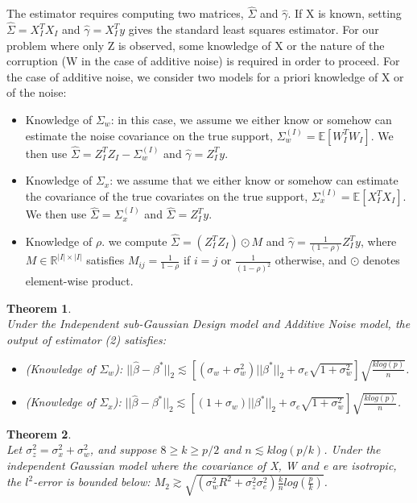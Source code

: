 \documentclass[a4paper,10pt]{article}
\newtheorem{theorem}{Theorem}
\theoremstyle{definition}
\begin{document}
The estimator requires computing two matrices, $\hat{\Sigma}$ and $\hat{\gamma}$. If X is known, setting $\hat{\Sigma} = X^T_I X_I$ and $\hat{\gamma} = X^T_Iy$ gives the standard least squares estimator. For our problem where only Z is observed, some knowledge of X or the nature of the corruption (W in the case of additive noise) is required in order to proceed. For the case of additive noise, we consider two models for a priori knowledge of X or of the noise:
\begin{itemize}
	\item Knowledge of $\Sigma_w$: in this case, we assume we either know or somehow can estimate the noise covariance on the true support, $\Sigma^{(I)}_w = \mathbb{E}[W^T_IW_I]$. We then use $\hat{\Sigma} = Z^T_I Z_I - \Sigma^{(I)}_w$ and $\hat{\gamma} = Z^T_Iy$.
	\item Knowledge of $\Sigma_x$: we assume that we either know or somehow can estimate the covariance of the true covariates on the true support, $\Sigma^{(I)}_x = \mathbb{E}[X^T_I X_I]$. We then use $\hat{\Sigma} = \Sigma^{(I)}_x$ and $\hat{\Sigma} = Z^T_Iy$.
	\item Knowledge of $\rho$. we compute $\hat{\Sigma} = (Z^T_I Z_I) \odot M$ and $\hat{\gamma} = \frac{1}{(1-\rho)}Z^T_Iy$, where $M \in \mathbb{R}^{|I|\times|I|}$ satisfies $M_{ij} = \frac{1}{1-\rho}$ if $i=j$ or $\frac{1}{(1-\rho)^2}$ otherwise, and $\odot$ denotes element-wise product.
\end{itemize}

\begin{theorem}\ \\
	Under the Independent sub-Gaussian Design model and Additive Noise model, the output of estimator (2) satisfies:
	\begin{itemize}
		\item (Knowledge of $\Sigma_w$): $||\hat{\beta} - \beta^*||_2 \lesssim [(\sigma_w + \sigma_w^2)||\beta^*||_2 + \sigma_e \sqrt{1+\sigma_w^2}]\sqrt{\frac{klog(p)}{n}}$.
		\item (Knowledge of $\Sigma_x$): $||\hat{\beta} - \beta^*||_2 \lesssim [(1 + \sigma_w)||\beta^*||_2 + \sigma_e \sqrt{1+\sigma_w^2}]\sqrt{\frac{klog(p)}{n}}$.
	\end{itemize}
\end{theorem}

\begin{theorem}\ \\
	Let $\sigma_z^2 = \sigma_x^2 + \sigma_w^2$, and suppose $8 \geq k \geq p/2$ and $n \lesssim k log (p/k)$. Under the independent Gaussian model where the covariance of X, W and e are isotropic, the $l^2$-error is bounded below: $M_2 \gtrsim \sqrt{(\sigma_w^2 R^2 + \sigma_z^2 \sigma_e^2)\frac{k}{n} log(\frac{p}{k})}$.
\end{theorem}
\end{document}
